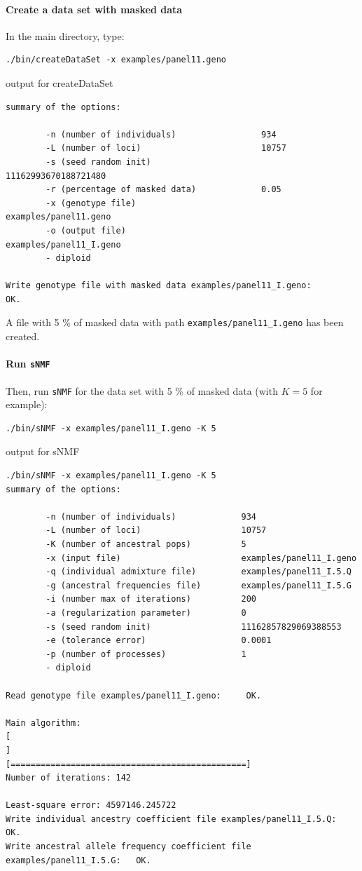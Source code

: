 \documentclass[10pt,a4paper]{article}
\begin{document}
\paragraph{Create a data set with masked data}

In the main directory, type:
\begin{Verbatim}[frame=single]
./bin/createDataSet -x examples/panel11.geno
\end{Verbatim}
\noindent
output for createDataSet
\begin{Verbatim}[frame=single]
summary of the options:

        -n (number of individuals)                 934
        -L (number of loci)                        10757
        -s (seed random init)                      11162993670188721480
        -r (percentage of masked data)             0.05
        -x (genotype file)                         examples/panel11.geno
        -o (output file)                           examples/panel11_I.geno
        - diploid

Write genotype file with masked data examples/panel11_I.geno:		OK.
\end{Verbatim}
\noindent
A file with 5 \% of masked data with path \verb|examples/panel11_I.geno| has been created.

\paragraph{Run {\tt sNMF}}

Then, run {\tt sNMF} for the data set with 5 \% of masked data (with $K=5$ for example):
\begin{Verbatim}[frame=single]
./bin/sNMF -x examples/panel11_I.geno -K 5
\end{Verbatim}
\noindent
output for sNMF
\begin{Verbatim}[frame=single]
./bin/sNMF -x examples/panel11_I.geno -K 5 
summary of the options:

        -n (number of individuals)             934
        -L (number of loci)                    10757
        -K (number of ancestral pops)          5
        -x (input file)                        examples/panel11_I.geno
        -q (individual admixture file)         examples/panel11_I.5.Q
        -g (ancestral frequencies file)        examples/panel11_I.5.G
        -i (number max of iterations)          200
        -a (regularization parameter)          0
        -s (seed random init)                  11162857829069388553
        -e (tolerance error)                   0.0001
        -p (number of processes)               1
        - diploid

Read genotype file examples/panel11_I.geno:		OK.

Main algorithm:
[                                                                           ]
[===============================================]
Number of iterations: 142

Least-square error: 4597146.245722
Write individual ancestry coefficient file examples/panel11_I.5.Q:		OK.
Write ancestral allele frequency coefficient file examples/panel11_I.5.G:	OK.
\end{Verbatim}
\end{document}
